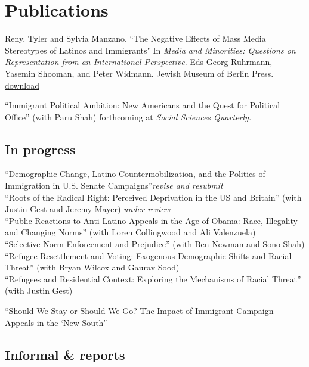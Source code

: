 \documentclass[11pt, a4paper]{article}
\newcommand{\years}[1]{\marginnote{\scriptsize #1}}
\begin{document}
\section*{Publications}

\years{2016} Reny, Tyler and Sylvia Manzano. ``The Negative Effects of Mass Media Stereotypes of Latinos and Immigrants" In \textit{Media and Minorities: Questions on Representation from an International Perspective}. Eds Georg Ruhrmann, Yasemin Shooman, and Peter Widmann. Jewish Museum of Berlin Press. \href{http://tylerreny.github.io/pdf/pubs/reny_manzano_stereotypes_2016.pdf}{download}

\years{2016} ``Immigrant Political Ambition:  New Americans and the Quest for Political Office'' (with Paru Shah) forthcoming at \textit{Social Sciences Quarterly.} \\

\subsection*{In progress}
\years{}``Demographic Change, Latino Countermobilization, and the Politics of Immigration in U.S. Senate Campaigns''\textit{revise and resubmit}\\
\years{}``Roots of the Radical Right: Perceived Deprivation in the US and Britain'' (with Justin Gest and Jeremy Mayer) \textit{under review}\\
\years{}``Public Reactions to Anti-Latino Appeals in the Age of Obama: Race, Illegality and Changing Norms'' (with Loren Collingwood and Ali Valenzuela)\\
\years{}``Selective Norm Enforcement and Prejudice'' (with Ben Newman and Sono Shah)\\
\years{}``Refugee Resettlement and Voting: Exogenous Demographic Shifts and Racial Threat'' (with Bryan Wilcox and Gaurav Sood)\\
\years{}``Refugees and Residential Context: Exploring the Mechanisms of Racial Threat'' (with Justin Gest)

\years{}``Should We Stay or Should We Go? The Impact of Immigrant Campaign Appeals in the `New South''\\

\subsection*{Informal \& reports}
\end{document}
